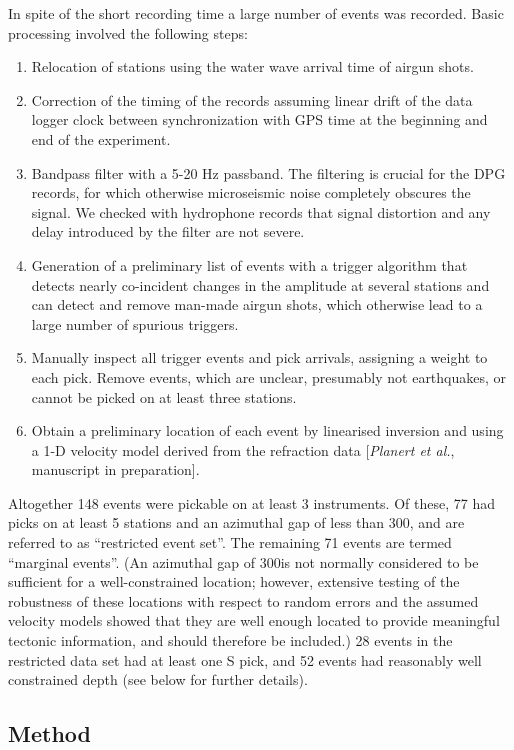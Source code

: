 \documentclass[jgr]{agu2001}
\newlength{\tw}
\begin{document}
\begin{article}
 In spite of the short recording time a large number of events was
recorded. Basic processing involved the following steps:
\begin{enumerate}
\item Relocation of stations using the water wave arrival time of
airgun shots.
\item 
Correction of the timing of the records assuming  linear drift
of the data logger clock between synchronization with GPS time at the
beginning and end of the experiment.  
\item Bandpass filter with a 5-20 Hz passband.  The
filtering is crucial for the DPG records, for which otherwise
microseismic noise completely obscures the signal. We checked with
hydrophone records that signal distortion and any delay introduced by
the filter are not severe.  
\item Generation of  a preliminary list of events
with a trigger algorithm that  detects nearly
co-incident changes in the amplitude at several stations and can
detect and remove man-made airgun shots, which otherwise lead to a
large number of spurious triggers.  
\item Manually inspect all trigger events and pick arrivals, assigning
a weight to each pick. Remove
events, which are unclear, presumably not earthquakes, or cannot be
picked on at least three stations. 
\item Obtain a preliminary location of each event by linearised
inversion and using a 1-D velocity model derived from the refraction
data [{\it Planert et al.}, manuscript in preparation].
\end{enumerate}
Altogether 148 events were pickable on at least 3 instruments. Of
these, 77 had picks on at least 5 stations and an azimuthal gap of
less than 300\dg, and are referred to as ``restricted event set''. The
remaining 71 events are termed ``marginal events''. (An azimuthal gap
of 300\dg is not normally considered to be sufficient for a
well-constrained location; however, extensive testing of the
robustness of these locations with respect to random errors and the
assumed velocity models showed that they are well enough located to
provide meaningful tectonic information, and should therefore be included.)
28 events in the
restricted data set
 had at least one S pick, and 52 events had reasonably well
constrained depth (see below for further details). 

\subsection{Method}


\end{article}
\end{document}

